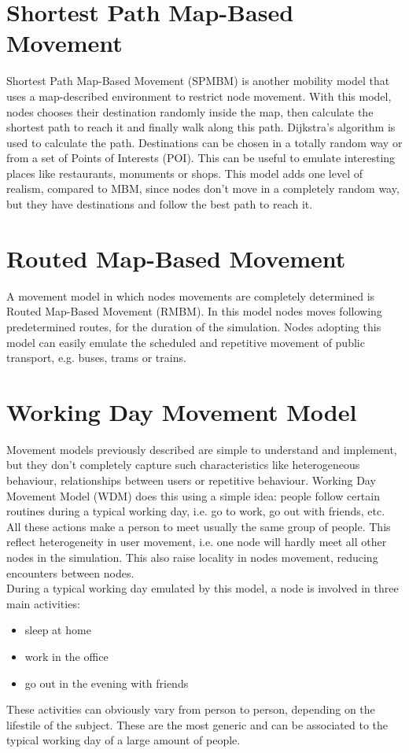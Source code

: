 \section{Shortest Path Map-Based Movement}
Shortest Path Map-Based Movement (SPMBM) is another mobility model that uses a map-described environment to restrict node movement. With this model, nodes chooses their destination randomly inside the map, then calculate the shortest path to reach it and finally walk along this path. Dijkstra's algorithm is used to calculate the path. Destinations can be chosen in a totally random way or from a set of Points of Interests (POI). This can be useful to emulate interesting places like restaurants, monuments or shops. This model adds one level of realism, compared to MBM, since nodes don't move in a completely random way, but they have destinations and follow the best path to reach it.


\section{Routed Map-Based Movement}
A movement model in which nodes movements are completely determined is Routed Map-Based Movement (RMBM). In this model nodes moves following predetermined routes, for the duration of the simulation. Nodes adopting this model can easily emulate the scheduled and repetitive movement of public transport, e.g. buses, trams or trains.


\section{Working Day Movement Model}
\label{descrWDM}
Movement models previously described are simple to understand and implement, but they don't completely capture such characteristics like heterogeneous behaviour, relationships between users or repetitive behaviour. Working Day Movement Model (WDM) \cite{articoloWdm} does this using a simple idea: people follow certain routines during a typical working day, i.e. go to work, go out with friends, etc. 
\\

All these actions make a person to meet usually the same group of people. This reflect heterogeneity in user movement, i.e. one node will hardly meet all other nodes in the simulation. This also raise locality in nodes movement, reducing encounters between nodes.
\\

During a typical working day emulated by this model, a node is involved in three main activities:
\begin{itemize}
\item sleep at home
\item work in the office
\item go out in the evening with friends
\end{itemize}
These activities can obviously vary from person to person, depending on the lifestile of the subject. These are the most generic and can be associated to the typical working day of a large amount of people.
\\

